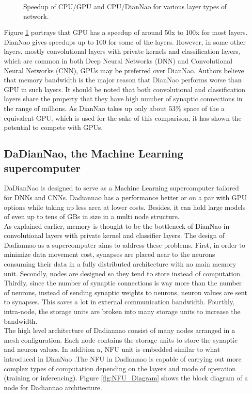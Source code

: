 \documentclass[runningheads,a4paper]{llncs}
\begin{document}
{\begin{figure}[h]
	\centering
	\caption{Speedup of CPU/GPU and CPU/DianNao for various layer types of network\cite{chen2014dadiannao}.}
	\label{fig:diannao_speedup}
\end{figure}

Figure \ref{fig:diannao_speedup} portrays that GPU has a speedup of around 50x to 100x for most layers. DianNao gives speedups up to 100 for some of the layers. However, in some other layers, mostly convolutional layers with private kernels and classification layers, which are common in both Deep Neural Networks (DNN) and Convolutional Neural Networks (CNN), GPUs may be preferred over DianNao. Authors believe that memory bandwidth is the major reason that DianNao performs worse than GPU in such layers. It should be noted that both convolutional and classification layers share the property that they have high number of synaptic connections in the range of millions. As DianNao takes up only about 53\% space of the a equivalent GPU, which is used for the sake of this comparison, it has shown the potential to compete with GPUs.
\subsection*{DaDianNao, the Machine Learning supercomputer}

DaDianNao is designed to serve as a Machine Learning supercomputer tailored for DNNs and CNNs. 
Dadiannao has a performance better or on a par with GPU options while taking up less area at lower costs. Besides, it can hold large models of even up to tens of GBs in size in a multi node structure.\\

As explained earlier, memory is thought to be the bottleneck of DianNao in convolutional layers with private kernel and classifier layers. The design of Dadiannao as a supercomputer aims to address these problems. First, in order to minimize data movement cost, synapses are placed near to the neurons consuming their data in a fully distributed architecture with no main memory unit. Secondly, nodes are designed so they tend to store instead of computation. Thirdly, since the number of synaptic connections is way more than the number of neurons,  instead of sending synaptic weights to neurons, neuron values are sent to synapses. This saves a lot in external communication bandwidth. Fourthly, intra-node, the storage units are broken into many storage units to increase the bandwidth.\\

The high level architecture of Dadiannao consist of many nodes arranged in a mesh configuration. Each node contains the storage units to store the synaptic and neuron values. In addition a, NFU unit is embedded similar to what introduced in DianNao \cite{chen2014diannao}.The NFU in Dadiannao is capable of carrying out more complex types of computation depending on the layers and mode of operation (training or inferencing). Figure \ref{fig:NFU_Diagram} shows the block diagram of a node for Dadiannao architecture. \\

}
\end{document}
